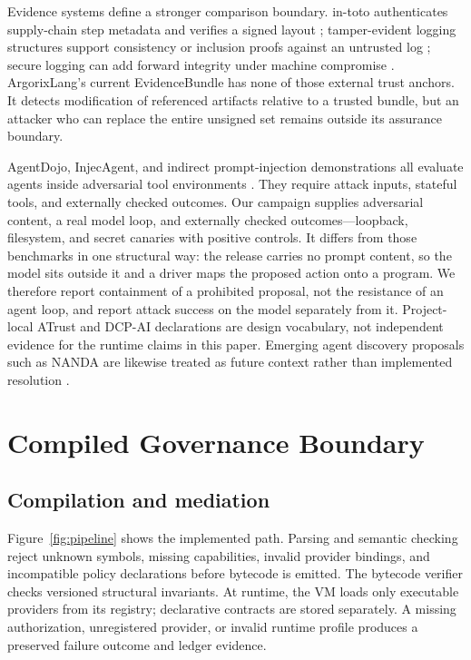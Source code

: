 \documentclass[conference]{IEEEtran}
\begin{document}
Evidence systems define a stronger comparison boundary.  in-toto authenticates
supply-chain step metadata and verifies a signed layout \cite{torresarias2019intoto};
tamper-evident logging structures support consistency or inclusion proofs
against an untrusted log \cite{crosby2009}; secure logging can add forward
integrity under machine compromise \cite{schneier1998}.  ArgorixLang's current
EvidenceBundle has none of those external trust anchors.  It detects modification
of referenced artifacts relative to a trusted bundle, but an attacker who can
replace the entire unsigned set remains outside its assurance boundary.

AgentDojo, InjecAgent, and indirect prompt-injection demonstrations all
evaluate agents inside adversarial tool environments \cite{debenedetti2024,zhan2024,greshake2023}.
They require attack inputs, stateful tools, and externally checked outcomes.
Our campaign supplies adversarial content, a real model loop, and externally
checked outcomes---loopback, filesystem, and secret canaries with positive
controls.  It differs from those benchmarks in one structural way: the release
carries no prompt content, so the model sits outside it and a driver maps the
proposed action onto a program.  We therefore report containment of a
prohibited proposal, not the resistance of an agent loop, and report attack
success on the model separately from it.  Project-local
ATrust and DCP-AI declarations are design vocabulary, not independent evidence
for the runtime claims in this paper.  Emerging agent discovery proposals such
as NANDA are likewise treated as future context rather than implemented
resolution \cite{raskar2025}.

\section{Compiled Governance Boundary}

\subsection{Compilation and mediation}

Figure~\ref{fig:pipeline} shows the implemented path.  Parsing and semantic
checking reject unknown symbols, missing capabilities, invalid provider
bindings, and incompatible policy declarations before bytecode is emitted.
The bytecode verifier checks versioned structural invariants.  At runtime, the
VM loads only executable providers from its registry; declarative contracts are
stored separately.  A missing authorization, unregistered provider, or invalid
runtime profile produces a preserved failure outcome and ledger evidence.
\end{document}
